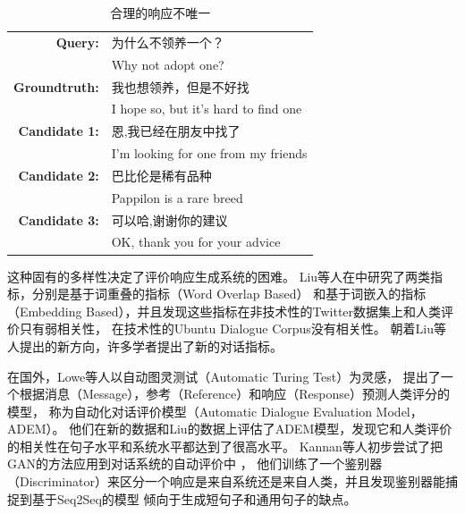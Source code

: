 \begin{table}[H]
    \centering
    \caption{合理的响应不唯一}
    \label{tab:multiple_valid_responses}
    \begin{tabular}{rl}
        \toprule
        \textbf{Query:} & 为什么不领养一个？ \\
        & Why not adopt one? \\
        \textbf{Groundtruth:} & 我也想领养，但是不好找 \\
        & I hope so, but it's hard to find one \\
        \midrule
        \textbf{Candidate 1:} & 恩,我已经在朋友中找了 \\
        & I'm looking for one from my friends \\
        \textbf{Candidate 2:} & 巴比伦是稀有品种 \\
        & Pappilon is a rare breed \\
        \textbf{Candidate 3:} & 可以哈,谢谢你的建议 \\
        & OK, thank you for your advice \\
        \bottomrule
    \end{tabular}
\end{table}

这种固有的多样性决定了评价响应生成系统的困难。
Liu等人在\cite{HowNot}中研究了两类指标，分别是基于词重叠的指标（Word Overlap Based）
和基于词嵌入的指标（Embedding Based），并且发现这些指标在非技术性的Twitter数据集上和人类评价只有弱相关性，
在技术性的Ubuntu Dialogue Corpus没有相关性。
朝着Liu等人提出的新方向，许多学者提出了新的对话指标。

在国外，Lowe等人以自动图灵测试（Automatic Turing Test）为灵感，
提出了一个根据消息（Message），参考（Reference）和响应（Response）预测人类评分的模型，
称为自动化对话评价模型（Automatic Dialogue Evaluation Model，ADEM）。
他们在新的数据和Liu的数据上评估了ADEM模型，发现它和人类评价的相关性在句子水平和系统水平都达到了很高水平。
Kannan等人初步尝试了把GAN的方法应用到对话系统的自动评价中
，
他们训练了一个鉴别器（Discriminator）来区分一个响应是来自系统还是来自人类，并且发现鉴别器能捕捉到基于Seq2Seq的模型
倾向于生成短句子和通用句子的缺点。



